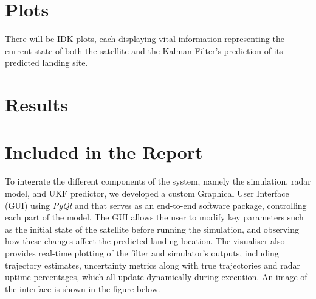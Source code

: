 \documentclass[12pt, a4paper]{article}
\begin{document}
\section{Plots}
There will be IDK plots, each displaying vital information representing the current state of both the satellite and the Kalman Filter's prediction of its predicted landing site. 

\section{Results}

\section{Included in the Report}
To integrate the different components of the system, namely the simulation, radar model, and UKF predictor, we developed a custom Graphical User Interface (GUI) using \textit{PyQt} and  that serves as an end-to-end software package, controlling each part of the model. The GUI allows the user to modify key parameters such as the initial state of the satellite before running the simulation, and observing how these changes affect the predicted landing location. The visualiser also provides real-time plotting of the filter and simulator's outputs, including trajectory estimates, uncertainty metrics along with true trajectories and radar uptime percentages, which all update dynamically during execution. An image of the interface is shown in the figure below.
\end{document}
